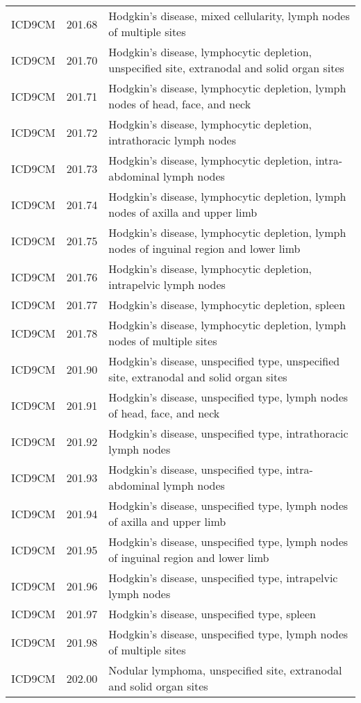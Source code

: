 \begin{longtable}{p{}p{}p{}}
  ICD9CM & 201.68 & Hodgkin's disease, mixed cellularity, lymph nodes of multiple sites \\ 
  ICD9CM & 201.70 & Hodgkin's disease, lymphocytic depletion, unspecified site, extranodal and solid organ sites \\ 
  ICD9CM & 201.71 & Hodgkin's disease, lymphocytic depletion, lymph nodes of head, face, and neck \\ 
  ICD9CM & 201.72 & Hodgkin's disease, lymphocytic depletion, intrathoracic lymph nodes \\ 
  ICD9CM & 201.73 & Hodgkin's disease, lymphocytic depletion, intra-abdominal lymph nodes \\ 
  ICD9CM & 201.74 & Hodgkin's disease, lymphocytic depletion, lymph nodes of axilla and upper limb \\ 
  ICD9CM & 201.75 & Hodgkin's disease, lymphocytic depletion, lymph nodes of inguinal region and lower limb \\ 
  ICD9CM & 201.76 & Hodgkin's disease, lymphocytic depletion, intrapelvic lymph nodes \\ 
  ICD9CM & 201.77 & Hodgkin's disease, lymphocytic depletion, spleen \\ 
  ICD9CM & 201.78 & Hodgkin's disease, lymphocytic depletion, lymph nodes of multiple sites \\ 
  ICD9CM & 201.90 & Hodgkin's disease, unspecified type, unspecified site, extranodal and solid organ sites \\ 
  ICD9CM & 201.91 & Hodgkin's disease, unspecified type, lymph nodes of head, face, and neck \\ 
  ICD9CM & 201.92 & Hodgkin's disease, unspecified type, intrathoracic lymph nodes \\ 
  ICD9CM & 201.93 & Hodgkin's disease, unspecified type, intra-abdominal lymph nodes \\ 
  ICD9CM & 201.94 & Hodgkin's disease, unspecified type, lymph nodes of axilla and upper limb \\ 
  ICD9CM & 201.95 & Hodgkin's disease, unspecified type, lymph nodes of inguinal region and lower limb \\ 
  ICD9CM & 201.96 & Hodgkin's disease, unspecified type, intrapelvic lymph nodes \\ 
  ICD9CM & 201.97 & Hodgkin's disease, unspecified type, spleen \\ 
  ICD9CM & 201.98 & Hodgkin's disease, unspecified type, lymph nodes of multiple sites \\ 
  ICD9CM & 202.00 & Nodular lymphoma, unspecified site, extranodal and solid organ sites \\ 

\end{longtable}
